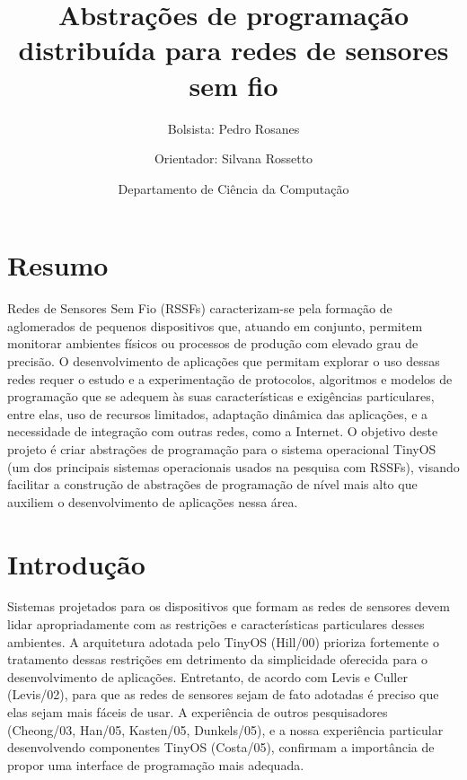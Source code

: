\documentclass[a4paper,onecolumn, 10pt]{article}
\title{Abstrações de programação distribuída para redes de sensores sem fio}
\author{Bolsista: Pedro Rosanes \and Orientador: Silvana Rossetto \and Departamento de Ciência da Computação}
\date{}
\begin{document}
\maketitle





\section{Resumo}\label{resumo}
Redes de Sensores Sem Fio (RSSFs) caracterizam-se pela formação de aglomerados de pequenos 
dispositivos que, atuando em conjunto, permitem monitorar ambientes físicos ou processos de 
produção com elevado grau de precisão. O desenvolvimento de aplicações que permitam explorar 
o uso dessas redes requer o estudo e a experimentação de protocolos, algoritmos e modelos de 
programação que se adequem às suas características e exigências particulares, entre elas, uso
de recursos limitados, adaptação dinâmica das aplicações, e a necessidade de integração com
outras redes, como a Internet. O objetivo deste projeto é criar abstrações de programação para
o sistema operacional TinyOS (um dos principais sistemas operacionais usados na pesquisa com 
RSSFs), visando facilitar a construção de abstrações de programação de nível mais alto que 
auxiliem o desenvolvimento de aplicações nessa área.

\section{Introdução}\label{intro}
Sistemas projetados para os dispositivos que formam as redes de sensores devem lidar apropriadamente
com as restrições e características particulares desses ambientes. A arquitetura adotada pelo TinyOS 
(Hill/00) prioriza fortemente o tratamento dessas restrições em detrimento da simplicidade oferecida
para o desenvolvimento de aplicações. Entretanto, de acordo com Levis e Culler (Levis/02), para que
as redes de sensores sejam de fato adotadas é preciso que elas sejam mais fáceis de usar. A experiência
de outros pesquisadores (Cheong/03, Han/05, Kasten/05, Dunkels/05), e a nossa experiência particular
desenvolvendo componentes TinyOS (Costa/05), confirmam a importância de propor uma interface de programação
mais adequada.\cite{tesesilvana}
\end{document}
